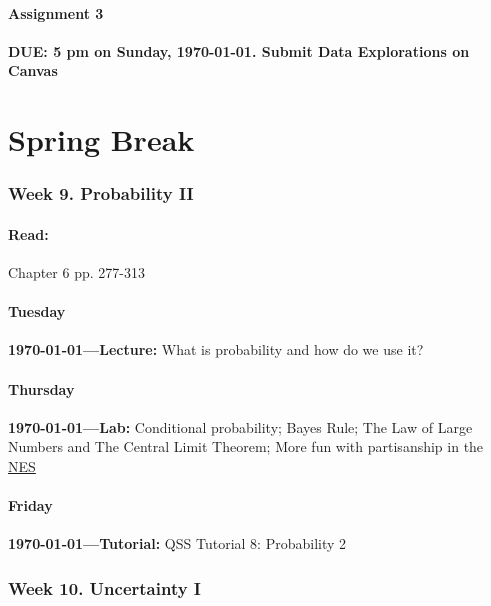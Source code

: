 \vspace{2em}
\subsection{Assignment 3} \textbf{DUE: 5 pm on Sunday, \today. Submit Data Explorations on Canvas}

\AdvanceDate[2]
\AdvanceDate[7]


\vspace{2em}

\part*{Spring Break}

\vspace{2em}


\section{Week 9. Probability II}

\subsection{Read:}

\citet{Imai2022-pm} Chapter 6 pp. 277-313


\subsection{Tuesday} \textbf{\today---Lecture:} What is probability and how do we use it? 
\AdvanceDate[2]

\subsection{Thursday} \textbf{\today---Lab:} Conditional probability; Bayes Rule; The Law of Large Numbers and The Central Limit Theorem; More fun with partisanship in the \href{http://electionstudies.org/}{NES}

\AdvanceDate[1]
\subsection{Friday} \textbf{\today---Tutorial:} QSS Tutorial 8: Probability 2
\AdvanceDate[4]

\clearpage
\section{Week 10. Uncertainty I}


